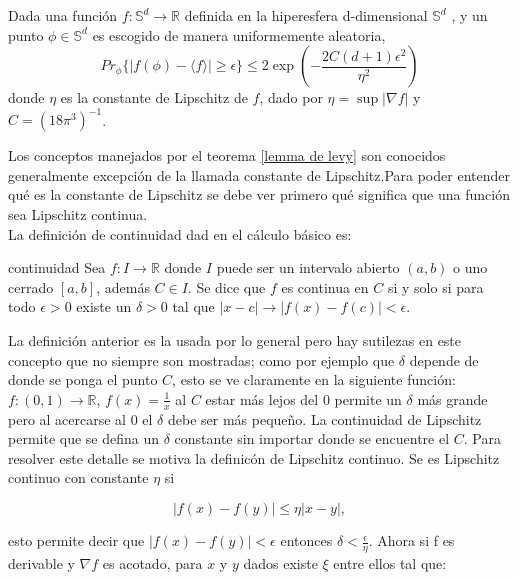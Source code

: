 \begin{lemma} \label{lemma de levy}

Dada una función $f: \mathbb{S}^d \to \mathbb{R} $ definida en la hiperesfera d-dimensional $\mathbb{S}^d$ , y un punto $\phi \in \mathbb{S}^d $ es escogido de manera uniformemente aleatoria,
\begin{equation}
Pr_{\phi} \{ |f(\phi)- \langle f \rangle| \geq \epsilon \} \leq 2 \exp(-\frac{2C(d+1)\epsilon^2}{\eta^2})
\end{equation}
donde $\eta$ es la constante de Lipschitz de $f$, dado por $\eta= \sup|\nabla f|$ y $C=(18 \pi^3)^{-1} $.\\

\end{lemma}

Los conceptos manejados por el teorema \ref{lemma de levy} son conocidos generalmente excepción de la llamada constante de Lipschitz.Para poder entender qué es la  constante de Lipschitz se debe ver primero qué significa que una función sea Lipschitz continua. 
\\
La definición de continuidad dad en el cálculo básico es:

\theoremstyle{definition}
\begin{definition}{continuidad}
Sea $f: I \to \mathbb{R}$ donde $I$ puede ser un intervalo abierto $(a,b)$ o uno cerrado $[a,b]$, además $C \in I$. Se dice que $f$ es continua en $C$ si y solo si para todo $ \epsilon >0 $  existe un $ \delta >0 $ tal que  $ |x-c|\longrightarrow |f(x)-f(c)|< \epsilon $.
\end{definition} 

La  definición anterior es la usada por lo general pero hay sutilezas en este concepto que no siempre son mostradas; como por ejemplo que $\delta$ depende de donde se ponga el  punto $C$, esto se ve claramente en la siguiente función: $f: (0,1) \to \mathbb{R}$, $f(x)=\frac{1}{x} $ al $C$ estar más lejos del $0$ permite un $\delta$ más grande pero al acercarse al $0$ el $\delta$ debe ser más pequeño. La continuidad de Lipschitz permite que se defina un $\delta$ constante sin importar donde se encuentre el $C$. Para resolver este detalle se motiva la definicón de Lipschitz continuo. Se es Lipschitz continuo con constante $\eta$ si

\begin{equation}
|f(x) -f(y)| \leq \eta |x-y|,
\end{equation}

esto permite decir que  $|f(x)-f(y)| < \epsilon $ entonces $\delta < \frac{\epsilon}{\eta} $. Ahora si f es derivable y $\nabla f$ es acotado, para $x$ y $y$ dados existe $\xi$ entre ellos tal que:


